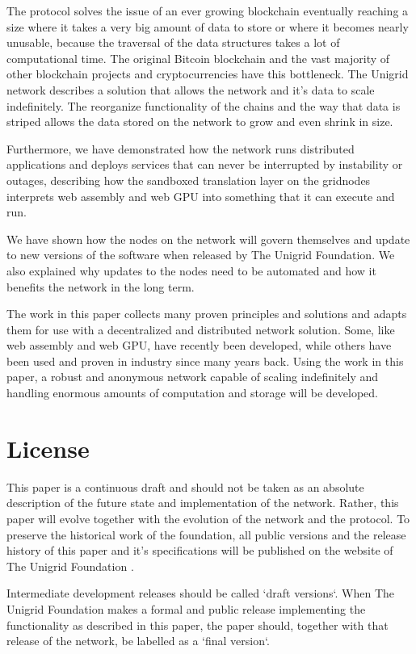 \documentclass[10pt,a4paper,final]{article}
\begin{document}
The protocol solves the issue of an ever growing blockchain eventually reaching a size where it takes a very big amount of data to store or where it becomes nearly unusable, because the traversal of the data structures takes a lot of computational time. The original Bitcoin blockchain and the vast majority of other blockchain projects and cryptocurrencies have this bottleneck. The Unigrid network describes a solution that allows the network and it's data to scale indefinitely. The reorganize functionality of the chains and the way that data is striped allows the data stored on the network to grow and even shrink in size.

Furthermore, we have demonstrated how the network runs distributed applications and deploys services that can never be interrupted by instability or outages, describing how the sandboxed translation layer on the \glspl{gridnode} interprets web assembly and web GPU into something that it can execute and run.

We have shown how the nodes on the network will govern themselves and update to new versions of the software when released by The Unigrid Foundation. We also explained why updates to the nodes need to be automated and how it benefits the network in the long term.

The work in this paper collects many proven principles and solutions and adapts them for use with a decentralized and distributed network solution. Some, like web assembly and web GPU, have recently been developed, while others have been used and proven in industry since many years back. Using the work in this paper, a robust and anonymous network capable of scaling indefinitely and handling enormous amounts of computation and storage will be developed.

\newpage
\section{License}
This paper is a continuous draft and should not be taken as an absolute description of the future state and implementation of the network. Rather, this paper will evolve together with the evolution of the network and the protocol. To preserve the historical work of the foundation, all public versions and the release history of this paper and it's specifications will be published on the website of The Unigrid Foundation \cite{unigrid}.

Intermediate development releases should be called `draft versions`. When The Unigrid Foundation makes a formal and public release implementing the functionality as described in this paper, the paper should, together with that release of the network, be labelled as a `final version`.
\end{document}
